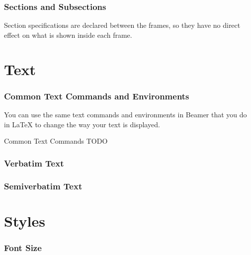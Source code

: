 \documentclass[aspectratio=169,utf8]{ctexbeamer}
\begin{document}
\begin{frame}
  \frametitle{Sections and Subsections}

  Section specifications are declared between the frames, so they have no direct effect on what is shown inside each frame.


\end{frame}


\section{Text}
\begin{frame}
  \frametitle{Common Text Commands and Environments}

  You can use the same text commands and environments in Beamer that you do in \LaTeX{} to change the way your text is displayed.

  \begin{block}{Common Text Commands}
    TODO
  \end{block}
\end{frame}

\begin{frame}
  \frametitle{Verbatim Text}
  
\end{frame}

\begin{frame}
  \frametitle{Semiverbatim Text}
  
\end{frame}


\section{Styles}

\begin{frame}
  \frametitle{Font Size}
  
\end{frame}
\end{document}
